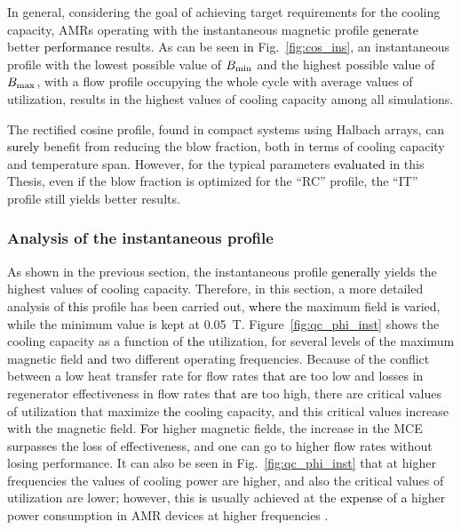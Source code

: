 \documentclass[referee]{svjour3}
\begin{document}
In general, considering the goal of achieving target requirements for the cooling capacity, AMRs operating with the instantaneous magnetic profile \textcolor{black}{generate} better \textcolor{black}{performance} results. As can be seen \textcolor{black}{in} Fig.~\ref{fig:cos_ins}, an instantaneous profile with the lowest possible value of $B_{\mathrm{min}}$ and the highest possible value of $B_{\mathrm{max}}$, with a flow profile occupying the whole cycle with average values of utilization, results in the highest values of cooling capacity among all simulations. 

The rectified cosine profile, found in compact systems using Halbach arrays, can \textcolor{black}{surely} benefit from reducing the blow fraction, both in terms of cooling capacity and temperature span. However, for the typical parameters \textcolor{black}{evaluated} in this Thesis, even if the blow fraction is optimized for the ``RC'' profile, the ``IT'' profile still yields better results.

\subsubsection{Analysis of the instantaneous profile}
\label{sec:deta-analys-inst}

As shown in the previous section, the instantaneous profile \textcolor{black}{generally} yields the highest values \textcolor{black}{of} cooling capacity. Therefore, in this section, a more detailed analysis of \textcolor{black}{this} profile has been carried out, \textcolor{black}{where the} maximum field  \textcolor{black}{is} varied, while the minimum value is kept at \SI{0.05}{\tesla}. Figure~\ref{fig:qc_phi_inst} shows the cooling capacity as a function of \textcolor{black}{the} utilization, for several levels of the maximum magnetic field \textcolor{black}{and} two different operating frequencies. Because of the conflict between a low heat transfer rate for flow rates \textcolor{black}{that are} too low and losses in regenerator effectiveness in flow rates \textcolor{black}{that are} too high, there are critical values of utilization that maximize \textcolor{black}{the} cooling capacity, and this critical values increase with the magnetic field. \textcolor{black}{For} higher magnetic fields, the increase in the MCE surpasses the loss of effectiveness, and one can go to higher flow rates without losing performance. It can also be seen in Fig.~\ref{fig:qc_phi_inst} that at  higher frequencies the values of cooling power are higher, and also the critical values of utilization are lower; however, this \textcolor{black}{is} usually achieved at the \textcolor{black}{expense} of \textcolor{black}{a} higher power consumption in AMR devices at higher frequencies \cite{bib:lei15_study,NIKNIA2016601}.
\end{document}
